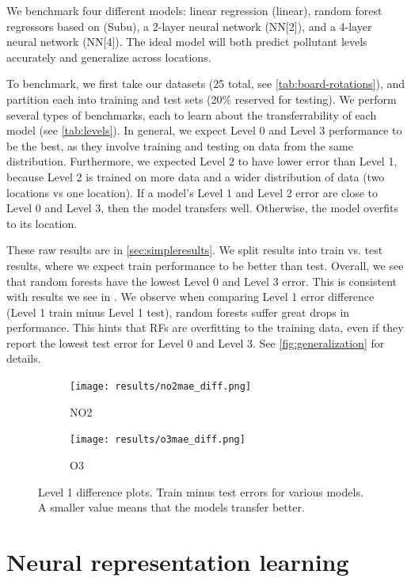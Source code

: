 \documentclass[journal abbreviation, manuscript]{copernicus}
\begin{document}
We benchmark four different models: linear regression (linear), random forest regressors based on \cite{subu}(Subu),
a 2-layer neural network (NN[2]), and a 4-layer neural network (NN[4]). The ideal model will
both predict pollutant levels accurately and
generalize across locations.

To benchmark, we first take our datasets (25 total, see \autoref{tab:board-rotations}), and partition each into training and test sets (20\% reserved for testing).
We perform several types of benchmarks,
each to learn about the transferrability of each model (see \autoref{tab:levels}).
In general, we expect Level 0 and Level 3 performance to be the best, as they involve training and testing on data from the same distribution. Furthermore, we expected Level 2 to have lower error than Level 1, because Level 2 is trained on more data and a wider distribution of data (two locations vs one location).
If a model's Level 1 and Level 2 error are close to Level 0 and Level 3, then the model transfers well. Otherwise, the model overfits to its location.


These raw results are in \autoref{sec:simpleresults}. 
We split results into train vs. test
results, where we expect train performance
to be better than test.
Overall, we see that random forests have the lowest Level 0 and Level 3 error. This is consistent with results we see in \cite{subu}. 
We observe when comparing Level 1 error difference (Level 1 train minus Level 1 test), random forests suffer great
drops in performance.
This hints that RFs are overfitting to the training data, even if they
report the lowest test error for Level 0 and Level 3.  See \autoref{fig:generalization} for 
details.

\begin{figure}[H]
\centering
\begin{subfigure}{0.45\textwidth}
\texttt{[image: results/no2mae\_diff.png]}
\caption{NO2}
\end{subfigure}
\begin{subfigure}{0.45\textwidth}
\texttt{[image: results/o3mae\_diff.png]}
\caption{O3}
\end{subfigure}
\caption{Level 1 difference plots. Train minus test errors for various models. A smaller value means that the models transfer better.}
\label{fig:generalization}
\end{figure}

\section{Neural representation learning}
\end{document}
